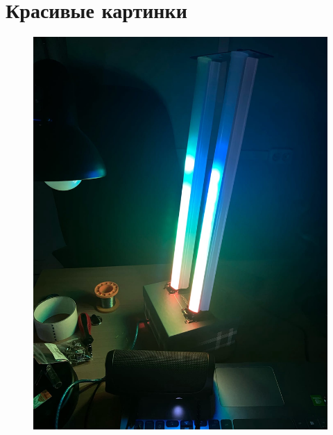 \documentclass[a4paper, 12pt]{article}%
\begin{document}
\section{Красивые картинки}

\newpage

\begin{figure}[!h]
\begin{center}
\includegraphics[scale=0.25]{pictures/bea1.jpg}
\end{center}
\end{figure}

\newpage
\end{document}
